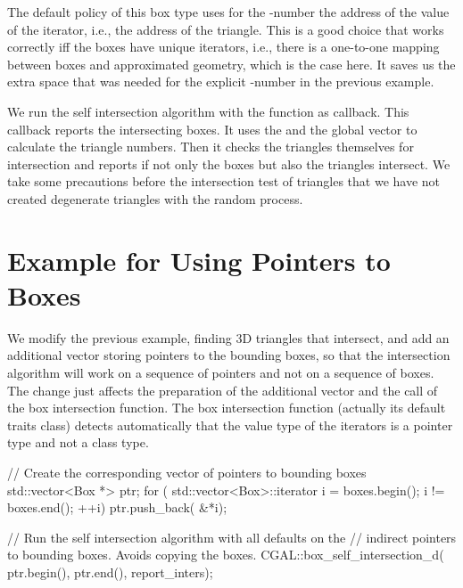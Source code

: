 The default policy of this box type uses for the -number the 
address of the value of the iterator, i.e., the address of the
triangle. This is a good choice that works correctly iff the boxes
have unique iterators, i.e., there is a one-to-one mapping between
boxes and approximated geometry, which is the case here. It saves us
the extra space that was needed for the explicit -number in
the previous example.

We run the self intersection algorithm with the 
function as callback. This callback reports the intersecting boxes. It
uses the  and the global  vector to
calculate the triangle numbers. Then it checks the triangles
themselves for intersection and reports if not only the boxes but also
the triangles intersect. We take some precautions before the
intersection test of triangles that we have not created degenerate
triangles with the random process.



\section{Example for Using Pointers to Boxes}

We modify the previous example, finding 3D triangles that intersect,
and add an additional vector  storing pointers to the bounding
boxes, so that the intersection algorithm will work on a sequence of
pointers and not on a sequence of boxes. The change just affects the
preparation of the additional vector and the call of the box intersection
function. The box intersection function (actually its default traits
class) detects automatically that the value type of the iterators is a
pointer type and not a class type.

\begin{ccExampleCode}
    // Create the corresponding vector of pointers to bounding boxes
    std::vector<Box *> ptr;
    for ( std::vector<Box>::iterator i = boxes.begin(); i != boxes.end(); ++i)
        ptr.push_back( &*i);
    
    // Run the self intersection algorithm with all defaults on the 
    // indirect pointers to bounding boxes. Avoids copying the boxes.
    CGAL::box_self_intersection_d( ptr.begin(), ptr.end(), report_inters);
\end{ccExampleCode}

